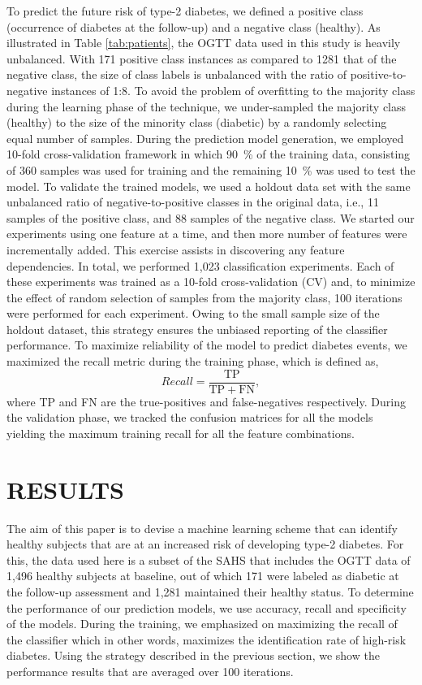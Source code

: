 \documentclass[a4paper,twoside]{article}
\begin{document}
To predict the future risk of type-2 diabetes, we defined a positive class (occurrence of diabetes at the follow-up) and a negative class (healthy). As illustrated in Table \ref{tab:patients}, the OGTT data used in this study is heavily unbalanced. With \num{171} positive class instances as compared to \num{1281} that of the negative class, the size of class labels is unbalanced with the ratio of positive-to-negative instances of 1:8. To avoid the problem of overfitting to the majority class during the learning phase of the technique, we under-sampled the majority class (healthy) to the size of the minority class (diabetic) by a randomly selecting equal number of samples. During the prediction model generation, we employed 10-fold cross-validation framework in which \SI{90}{\percent} of the training data, consisting of \num{360} samples was used for training and the remaining \SI{10}{\percent} was used to test the model. To validate the trained models, we used a holdout data set with the same unbalanced ratio of negative-to-positive classes in the original data, i.e., \num{11} samples of the positive class, and \num{88} samples of the negative class. We started our experiments using one feature at a time, and then more number of features were incrementally added. This exercise assists in discovering any feature dependencies. In total, we performed 1,023 classification experiments.  Each of these experiments was trained as a 10-fold cross-validation (CV) and, to minimize the effect of random selection of samples from the majority class, \num{100} iterations were performed for each experiment. Owing to the small sample size of the holdout dataset, this strategy ensures the unbiased reporting of the classifier performance. To maximize reliability of the model to predict diabetes events, we maximized the recall metric during the training phase, which is defined as,
% 
\begin{equation}
    Recall = \frac{\mathrm{TP}}{\mathrm{TP} + \mathrm{FN}},
\end{equation}
% 
where TP and FN are the true-positives and false-negatives respectively. During the validation phase, we tracked the confusion matrices for all the models yielding the maximum training recall for all the feature combinations.
%
\section{\uppercase{Results}}
% 
The aim of this paper is to devise a machine learning scheme that can identify healthy subjects that are at an increased risk of developing type-2 diabetes. For this, the data used here is a subset of the SAHS that includes the OGTT data of 1,496 healthy subjects at baseline, out of which \num{171} were labeled as diabetic at the follow-up assessment and 1,281 maintained their healthy status. To determine the performance of our prediction models, we use accuracy, recall and specificity of the models. During the training, we emphasized on maximizing the recall of the classifier which in other words, maximizes the identification rate of high-risk diabetes. Using the strategy described in the previous section, we show the performance results that are averaged over \num{100} iterations. 
% 
\end{document}
